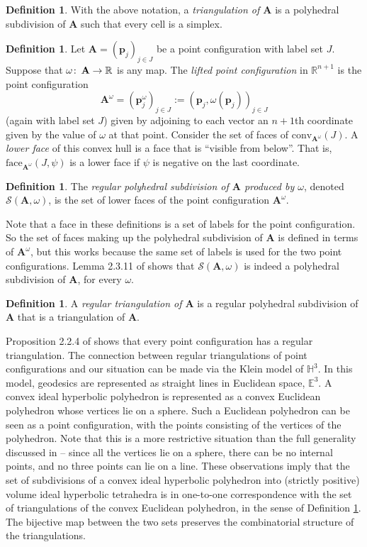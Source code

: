 \documentclass[12pt]{amsart}
\theoremstyle{definition}
\newtheorem{defn}[thm]{Definition}
\theoremstyle{remark}
\newcommand{\co}{\colon\thinspace}
\def\H{\mathbb{H}}
\def\R{\mathbb{R}}
\def\E{\mathbb{E}}
\def \bA{\mathbf{A}} %
\def \bp{\mathbf{p}}
\begin{document}
\begin{defn}\label{point config triangulation}
With the above notation, a \emph{triangulation of $\bA$} is a polyhedral subdivision of $\bA$ such that every cell is a simplex.
\end{defn}

\begin{defn}
Let $\bA = (\bp_j)_{j\in J}$ be a point configuration with label set $J$. Suppose that $\omega\co \bA\to\R$ is any map. The \emph{lifted point configuration} in $\R^{n+1}$ is the point configuration 
$$\bA^\omega = (\bp^\omega_j)_{j\in J} := (\bp_j, \omega(\bp_j))_{j\in J} $$
(again with label set $J$) given by adjoining to each vector an $n+1$th coordinate given by the value of $\omega$ at that point. Consider the set of faces of $\text{conv}_{\bA^\omega}(J)$. A \emph{lower face} of this convex hull is a face that is ``visible from below''. That is, $\text{face}_{\bA^\omega}(J, \psi)$ is a lower face if $\psi$ is negative 
on the last coordinate. 
\end{defn}
\begin{defn}
The \emph{regular polyhedral subdivision of $\bA$ produced by $\omega$}, denoted $\mathcal{S}(\bA,\omega)$, is the set of lower faces of the point configuration $\bA^\omega$. 
\end{defn}
Note that a face in these definitions is a set of labels for the point configuration. So the set of faces making up the polyhedral subdivision of $\bA$ is defined in terms of $\bA^\omega$, but this works because the same set of labels is used for the two point configurations. Lemma 2.3.11 of 
\cite{DeLoera:book} shows that $\mathcal{S}(\bA,\omega)$ is indeed a polyhedral subdivision of $\bA$, for every $\omega$.

\begin{defn}
A \emph{regular triangulation of $\bA$} is a regular polyhedral subdivision of $\bA$ that is a triangulation of $\bA$. 
\end{defn}

Proposition 2.2.4 of \cite{DeLoera:book} shows that every point configuration has a regular triangulation. The connection between regular triangulations of point configurations and our situation can be made via the Klein model of $\H^3$. In this model, geodesics are represented as straight lines in Euclidean space, $\E^3$. A convex ideal hyperbolic polyhedron is represented as a convex Euclidean polyhedron whose vertices lie on a sphere. Such a Euclidean polyhedron can be seen as a point configuration, with the points consisting of the vertices of the polyhedron. Note that this is a more restrictive situation than the full generality discussed in \cite{DeLoera:book} -- since all the vertices lie on a sphere, there can be no internal points, and no three points can lie on a line. These observations imply that the set of subdivisions of a convex ideal hyperbolic polyhedron into (strictly positive) volume ideal hyperbolic tetrahedra is in one-to-one correspondence with the set of triangulations of the convex Euclidean polyhedron, in the sense of Definition \ref{point config triangulation}. The bijective map between the two sets preserves the combinatorial structure of the triangulations.
\end{document}
